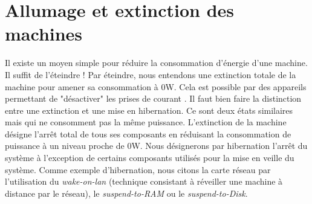 \begin{onehalfspace}
\end{onehalfspace}

\section{Allumage et extinction des machines}
\begin{onehalfspace}

Il existe un moyen simple pour réduire la consommation d'énergie d’une machine. Il suffit de l’éteindre !
Par éteindre, nous entendons une extinction totale de la machine pour amener sa consommation à 0W. Cela est  possible par des appareils permettant de "désactiver" les prises de courant \cite{ref33}. Il faut bien faire la distinction entre une extinction et une mise en hibernation. Ce sont deux états similaires mais qui ne consomment pas la même puissance.
L’extinction de la machine désigne l’arrêt total de tous ses composants en réduisant la consommation de puissance à un niveau proche de 0W. Nous désignerons par  hibernation l’arrêt du système à l’exception de certains composants utilisés pour la mise en veille du système. Comme exemple d’hibernation, nous citons la carte réseau par l’utilisation du \textit{wake-on-lan} (technique consistant à réveiller une machine à distance par le réseau), le \textit{suspend-to-RAM} ou le \textit{suspend-to-Disk}.


\end{onehalfspace}
